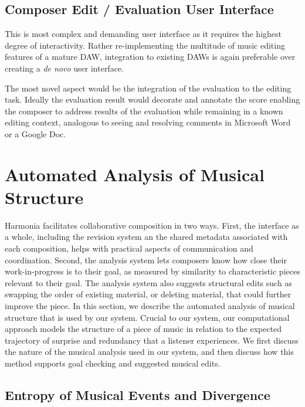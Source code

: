 \documentclass[final,authoryear,5p,times,twocolumn]{elsarticle}
\begin{document}
\subsection{Composer Edit / Evaluation User Interface}

This is most complex and demanding user interface as it requires the highest degree of interactivity. Rather re-implementing the multitude of music editing features of a mature DAW, integration to existing DAWs is again preferable over creating a \textit{de novo} user interface. 

The most novel aspect would be the integration of the evaluation to the editing task. Ideally the evaluation result would decorate and annotate the score enabling the composer to address results of the evaluation while remaining in a known editing context, analogous to seeing and resolving comments in Microsoft Word or a Google Doc.

 
 

\section{Automated Analysis of Musical Structure}

Harmonia facilitates collaborative composition in two ways. First, the interface as a whole, including the revision system an the shared metadata associated with each composition, helps with practical aspects of communication and coordination. Second, the analysis system lets composers know how close their work-in-progress is to their goal, as measured by similarity to characteristic pieces relevant to their goal. The analysis system also suggests structural edits such as swapping the order of existing material, or deleting material, that could further improve the piece. In this section, we describe the automated analysis of musical structure that is used by our system. Crucial to our system, our computational approach models the structure of a piece of music in relation to the expected trajectory of surprise and redundancy that a listener experiences. We first discuss the nature of the musical analysis used in our system, and then discuss how this method supports goal checking and suggested musical edits.

 \subsection{Entropy of Musical Events and Divergence}
 
\end{document}
